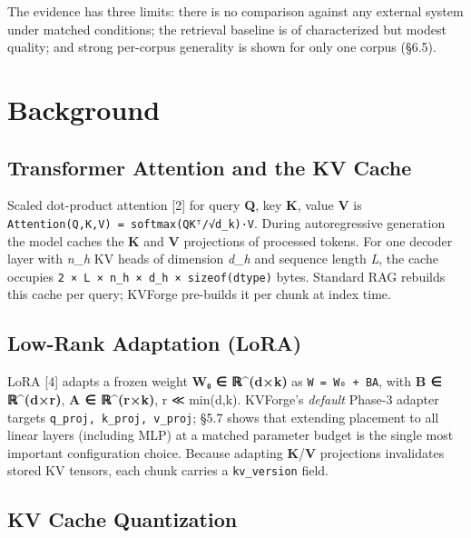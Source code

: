 The evidence has three limits: there is no comparison against any external system under matched conditions; the retrieval baseline is of characterized but modest quality; and strong per-corpus generality is shown for only one corpus (§6.5).

\hypertarget{background}{%
\section{Background}\label{background}}

\hypertarget{transformer-attention-and-the-kv-cache}{%
\subsection{Transformer Attention and the KV Cache}\label{transformer-attention-and-the-kv-cache}}

Scaled dot-product attention {[}2{]} for query \textbf{Q}, key \textbf{K}, value \textbf{V} is \texttt{Attention(Q,K,V)\ =\ softmax(QKᵀ/√d\_k)·V}. During autoregressive generation the model caches the \textbf{K} and \textbf{V} projections of processed tokens. For one decoder layer with \emph{n\_h} KV heads of dimension \emph{d\_h} and sequence length \emph{L}, the cache occupies \texttt{2\ ×\ L\ ×\ n\_h\ ×\ d\_h\ ×\ sizeof(dtype)} bytes. Standard RAG rebuilds this cache per query; KVForge pre-builds it per chunk at index time.

\hypertarget{low-rank-adaptation-lora}{%
\subsection{Low-Rank Adaptation (LoRA)}\label{low-rank-adaptation-lora}}

LoRA {[}4{]} adapts a frozen weight \textbf{W₀ ∈ ℝ\^{}(d×k)} as \texttt{W\ =\ W₀\ +\ BA}, with \textbf{B ∈ ℝ\^{}(d×r)}, \textbf{A ∈ ℝ\^{}(r×k)}, r ≪ min(d,k). KVForge's \emph{default} Phase-3 adapter targets \texttt{q\_proj,\ k\_proj,\ v\_proj}; §5.7 shows that extending placement to all linear layers (including MLP) at a matched parameter budget is the single most important configuration choice. Because adapting \textbf{K}/\textbf{V} projections invalidates stored KV tensors, each chunk carries a \texttt{kv\_version} field.

\hypertarget{kv-cache-quantization}{%
\subsection{KV Cache Quantization}\label{kv-cache-quantization}}

